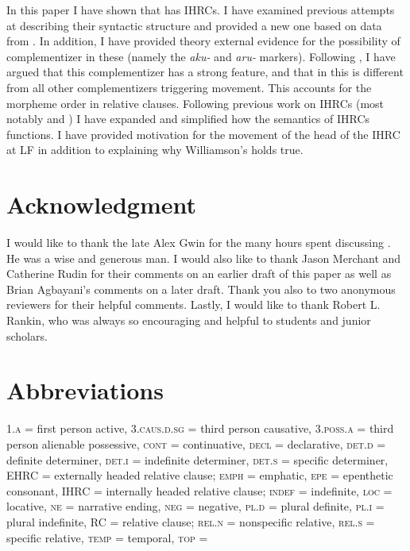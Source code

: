 \documentclass[output=paper]{LSP/langsci}
\begin{document}
In this paper I have shown that  has IHRCs. I have examined previous attempts at describing their syntactic structure and provided a new one based on data from . In addition, I have provided theory external evidence for the possibility of complementizer in these  (namely the \textit{aku-} and \textit{aru-} markers). Following \citet{Culy1990}, I have argued that this complementizer has a strong feature, and that in  this is different from all other complementizers triggering movement. This accounts for the morpheme order in  relative clauses.  Following previous work on IHRCs (most notably \citealt{Williamson1987} and \citealt{Culy1990}) I have expanded and simplified how the semantics of IHRCs functions. I have provided motivation for the movement of the head of the IHRC at LF in addition to explaining why Williamson's  holds true.

\section*{Acknowledgment}

I would like to thank the late Alex Gwin for the many hours spent discussing . He was a wise and generous man. I would also like to thank Jason Merchant and Catherine Rudin for their comments on an earlier draft of this paper as well as Brian Agbayani's comments on a later draft. Thank you also to two anonymous reviewers for their helpful comments. Lastly, I would like to thank Robert L. Rankin, who was always so encouraging and helpful to students and junior scholars.

\section*{Abbreviations}

\textsc{1.a} = first person active, \textsc{3.caus.d.sg} = third person causative, \textsc{3.poss.a} = third person alienable possessive, \textsc{cont} = continuative, \textsc{decl} = declarative, \textsc{det.d} = definite determiner, \textsc{det.i} = indefinite determiner, \textsc{det.s} = specific determiner, EHRC = externally headed relative clause; \textsc{emph} = emphatic, \textsc{epe} = epenthetic consonant, IHRC = internally headed relative clause; \textsc{indef} = indefinite, \textsc{loc} = locative, \textsc{ne} = narrative ending, \textsc{neg} = negative, \textsc{pl.d} = plural definite, \textsc{pl.i} = plural indefinite, RC = relative clause; \textsc{rel.n} = nonspecific relative, \textsc{rel.s} = specific relative, \textsc{temp} = temporal, \textsc{top} = 

{\sloppy
\printbibliography[heading=subbibliography,notkeyword=this]
}
\end{document}

